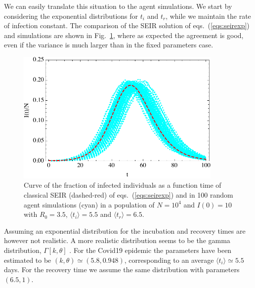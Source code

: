 \documentclass[a4paper,oneside,11pt]{article}
\begin{document}
We can easily translate this situation to the agent simulations.  
We start by considering the exponential distributions for $t_i$ and $t_r$, while we maintain the rate of infection constant. The comparison of the SEIR solution of eqs.~(\ref{eqs:seirexp}) and simulations are shown in Fig.~\ref{fig:exp}, where as expected the agreement is good, even if the variance is much larger than in the fixed parameters case.
\begin{figure}[h!]
  \centering
  \includegraphics[width=10cm]{expseir.pdf}
  \caption{ Curve of the fraction of infected individuals as a function time of  classical SEIR (dashed-red) of eqs.~(\ref{eqs:seirexp}) and in 100 random agent simulations (cyan) in a  population of $N=10^4$ and $I(0)=10$ with $R_0=3.5$, $\langle t_i\rangle=5.5$ and $\langle t_r\rangle=6.5$.  }
  \label{fig:exp}
   \end{figure}  
   
    Assuming an exponential distribution for the incubation and recovery times are however not realistic. A more realistic distribution seems to be the  gamma distribution, $\Gamma[k,\theta]$ \cite{}. For the Covid19 epidemic the parameters have been estimated to be $(k,\theta) \simeq (5.8, 0.948)$, corresponding to an average $\langle t_i\rangle \simeq 5.5$days. For the recovery time we assume the same distribution with parameters $(6.5,1)$.
\end{document}
